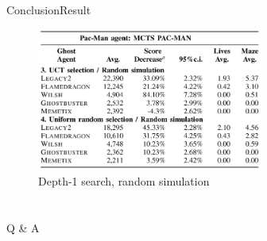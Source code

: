 \documentclass{beamer}
\begin{document}
  \begin{frame}{Conclusion}{Result}
    \begin{figure}
      \includegraphics[height = 4.7cm]{r_random.png}
      \caption{Depth-1 search, random simulation}
    \end{figure}
  \end{frame}

  \section{}
  \begin{frame}{Q \& A}

  \end{frame}
\end{document}
